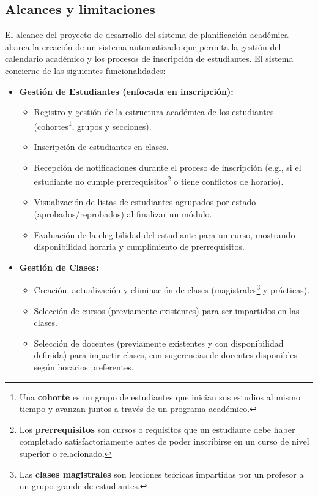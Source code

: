 \subsection{Alcances y limitaciones}
El alcance del proyecto de desarrollo del sistema de planificación académica abarca la creación de un sistema automatizado que permita la gestión del calendario académico y los procesos de inscripción de estudiantes.
El sistema concierne de las siguientes funcionalidades:

\begin{itemize}
\item \textbf{Gestión de Estudiantes (enfocada en inscripción):}
    \begin{itemize}
	\item Registro y gestión de la estructura académica de los estudiantes (cohortes\footnote{Una \textbf{cohorte} es un grupo de estudiantes que inician sus estudios al mismo tiempo y avanzan juntos a través de un programa académico.}, grupos y secciones).
	\item Inscripción de estudiantes en clases.
	\item Recepción de notificaciones durante el proceso de inscripción (e.g., si el estudiante no cumple prerrequisitos\footnote{Los \textbf{prerrequisitos} son cursos o requisitos que un estudiante debe haber completado satisfactoriamente antes de poder inscribirse en un curso de nivel superior o relacionado.} o tiene conflictos de horario).
	\item Visualización de listas de estudiantes agrupados por estado (aprobados/reprobados) al finalizar un módulo.
	\item Evaluación de la elegibilidad del estudiante para un curso, mostrando disponibilidad horaria y cumplimiento de prerrequisitos.
    \end{itemize}
\item \textbf{Gestión de Clases:}
    \begin{itemize}
	\item Creación, actualización y eliminación de clases (magistrales\footnote{Las \textbf{clases magistrales} son lecciones teóricas impartidas por un profesor a un grupo grande de estudiantes.} y prácticas).
	\item Selección de cursos (previamente existentes) para ser impartidos en las clases.
	\item Selección de docentes (previamente existentes y con disponibilidad definida) para impartir clases, con sugerencias de docentes disponibles según horarios preferentes.

\end{itemize}
\end{itemize}
